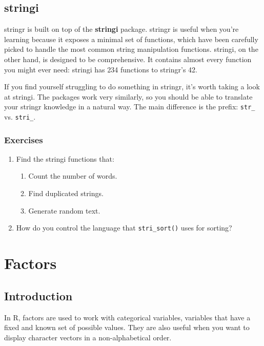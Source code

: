 \documentclass[]{book}
\providecommand{\tightlist}{%
  \setlength{\itemsep}{0pt}\setlength{\parskip}{0pt}}
\begin{document}
\section{stringi}\label{stringi}

stringr is built on top of the \textbf{stringi} package. stringr is
useful when you're learning because it exposes a minimal set of
functions, which have been carefully picked to handle the most common
string manipulation functions. stringi, on the other hand, is designed
to be comprehensive. It contains almost every function you might ever
need: stringi has 234 functions to stringr's 42.

If you find yourself struggling to do something in stringr, it's worth
taking a look at stringi. The packages work very similarly, so you
should be able to translate your stringr knowledge in a natural way. The
main difference is the prefix: \texttt{str\_} vs. \texttt{stri\_}.

\subsection{Exercises}\label{exercises-42}

\begin{enumerate}
\def\labelenumi{\arabic{enumi}.}
\item
  Find the stringi functions that:

  \begin{enumerate}
  \def\labelenumii{\arabic{enumii}.}
  \tightlist
  \item
    Count the number of words.
  \item
    Find duplicated strings.
  \item
    Generate random text.
  \end{enumerate}
\item
  How do you control the language that \texttt{stri\_sort()} uses for
  sorting?
\end{enumerate}

\chapter{Factors}\label{factors}

\section{Introduction}\label{introduction-9}

In R, factors are used to work with categorical variables, variables
that have a fixed and known set of possible values. They are also useful
when you want to display character vectors in a non-alphabetical order.
\end{document}
